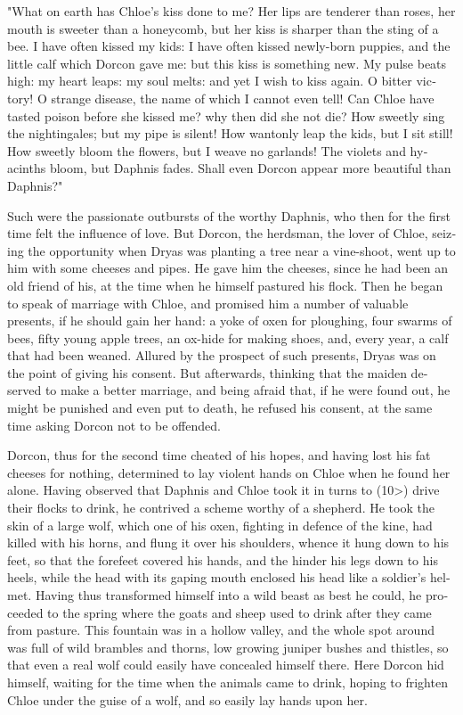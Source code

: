 \documentclass{book}
\begin{document}
\begin{pairs}
\begin{Rightside}
\begin{english}
  "What on earth has Chloe's kiss done to me?  Her lips are tenderer than roses, her mouth is sweeter than a honeycomb, but her kiss is sharper than the sting of a bee.  I have often kissed my kids: I have often kissed newly-born puppies, and the little calf which Dorcon gave me: but this kiss is something new.  My pulse beats high: my heart leaps: my soul melts: and yet I wish to kiss again.  O bitter victory!  O strange disease, the name of which I cannot even tell!  Can Chloe have tasted poison before she kissed me? why then did she not die?  How sweetly sing the nightingales; but my pipe is silent!  How wantonly leap the kids, but I sit still!  How sweetly bloom the flowers, but I weave no garlands!  The violets and hyacinths bloom, but Daphnis fades.  Shall even Dorcon appear more beautiful than Daphnis?"
\pend


  Such were the passionate outbursts of the worthy Daphnis, who then for the first time felt the influence of love.  But Dorcon, the herdsman, the lover of Chloe, seizing the opportunity when Dryas was planting a tree near a vine-shoot, went up to him with some cheeses and pipes.  He gave him the cheeses, since he had been an old friend of his, at the time when he himself pastured his flock.  Then he began to speak of marriage with Chloe, and promised him a number of valuable presents, if he should gain her hand: a yoke of oxen for ploughing, four swarms of bees, fifty young apple trees, an ox-hide for making shoes, and, every year, a calf that had been weaned.  Allured by the prospect of such presents, Dryas was on the point of giving his consent.  But afterwards, thinking that the maiden deserved to make a better marriage, and being afraid that, if he were found out, he might be punished and even put to death, he refused his consent, at the same time asking Dorcon not to be offended.
\pend


  Dorcon, thus for the second time cheated of his hopes, and having lost his fat cheeses for nothing, determined to lay violent hands on Chloe when he found her alone.  Having observed that Daphnis and Chloe took it in turns to (10>) drive their flocks to drink, he contrived a scheme worthy of a shepherd.  He took the skin of a large wolf, which one of his oxen, fighting in defence of the kine, had killed with his horns, and flung it over his shoulders, whence it hung down to his feet, so that the forefeet covered his hands, and the hinder his legs down to his heels, while the head with its gaping mouth enclosed his head like a soldier's helmet.  Having thus transformed himself into a wild beast as best he could, he proceeded to the spring where the goats and sheep used to drink after they came from pasture.  This fountain was in a hollow valley, and the whole spot around was full of wild brambles and thorns, low growing juniper bushes and thistles, so that even a real wolf could easily have concealed himself there.  Here Dorcon hid himself, waiting for the time when the animals came to drink, hoping to frighten Chloe under the guise of a wolf, and so easily lay hands upon her.
\pend



\end{english}
\end{Rightside}
\end{pairs}
\end{document}
